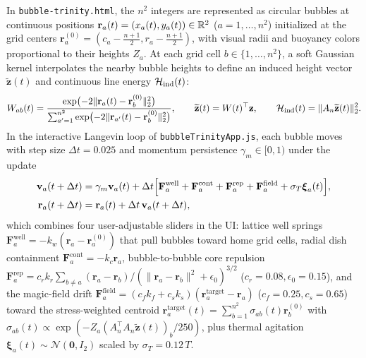 In \texttt{bubble-trinity.html}, the $n^2$ integers are represented as circular bubbles at continuous positions $\mathbf{r}_a(t) = (x_a(t), y_a(t)) \in \mathbb{R}^2$ ($a=1,\dots,n^2$) initialized at the grid centers $\mathbf{r}_a^{(0)} = (c_a - \frac{n+1}{2}, r_a - \frac{n+1}{2})$, with visual radii and buoyancy colors proportional to their heights $Z_a$. At each grid cell $b \in \{1,\dots,n^2\}$, a soft Gaussian kernel interpolates the nearby bubble heights to define an induced height vector $\widetilde{\mathbf{z}}(t)$ and continuous line energy $\mathcal{H}_{\mathrm{ind}}(t)$:
\begin{equation}
  W_{ab}(t) = \frac{\exp\bigl(-2\|\mathbf{r}_a(t) - \mathbf{r}_b^{(0)}\|_2^2\bigr)}{\sum_{a'=1}^{n^2} \exp\bigl(-2\|\mathbf{r}_{a'}(t) - \mathbf{r}_b^{(0)}\|_2^2\bigr)}, \qquad
  \widetilde{\mathbf{z}}(t) = W(t)^\top \mathbf{z}, \qquad
  \mathcal{H}_{\mathrm{ind}}(t) = \|A_n \widetilde{\mathbf{z}}(t)\|_2^2.
  \label{eq:kernel_induced_H}
\end{equation}
In the interactive Langevin loop of \texttt{bubbleTrinityApp.js}, each bubble moves with step size $\Delta t = 0.025$ and momentum persistence $\gamma_m \in [0,1)$ under the update
\begin{equation}
  \begin{aligned}
    \mathbf{v}_a(t+\Delta t) &= \gamma_m \mathbf{v}_a(t) + \Delta t\Bigl[\mathbf{F}_a^{\mathrm{well}} + \mathbf{F}_a^{\mathrm{cont}} + \mathbf{F}_a^{\mathrm{rep}} + \mathbf{F}_a^{\mathrm{field}} + \sigma_T \boldsymbol{\xi}_a(t)\Bigr], \\
    \mathbf{r}_a(t+\Delta t) &= \mathbf{r}_a(t) + \Delta t\,\mathbf{v}_a(t+\Delta t),
  \end{aligned}
  \label{eq:langevin_sde}
\end{equation}
which combines four user-adjustable sliders in the UI: lattice well springs $\mathbf{F}_a^{\mathrm{well}} = -k_w(\mathbf{r}_a - \mathbf{r}_a^{(0)})$ that pull bubbles toward home grid cells, radial dish containment $\mathbf{F}_a^{\mathrm{cont}} = -k_c \mathbf{r}_a$, bubble-to-bubble core repulsion $\mathbf{F}_a^{\mathrm{rep}} = c_r k_r \sum_{b\ne a} (\mathbf{r}_a - \mathbf{r}_b)/(\|\mathbf{r}_a - \mathbf{r}_b\|^2 + \epsilon_0)^{3/2}$ ($c_r=0.08, \epsilon_0=0.15$), and the magic-field drift $\mathbf{F}_a^{\mathrm{field}} = (c_f k_f + c_s k_s)(\mathbf{r}_a^{\mathrm{target}} - \mathbf{r}_a)$ ($c_f=0.25, c_s=0.65$) toward the stress-weighted centroid $\mathbf{r}_a^{\mathrm{target}}(t) = \sum_{b=1}^{n^2} \sigma_{ab}(t)\mathbf{r}_b^{(0)}$ with $\sigma_{ab}(t) \propto \exp(-Z_a (A_n^\top A_n\widetilde{\mathbf{z}}(t))_b / 250)$, plus thermal agitation $\boldsymbol{\xi}_a(t) \sim \mathcal{N}(\mathbf{0}, I_2)$ scaled by $\sigma_T = 0.12\,T$.

